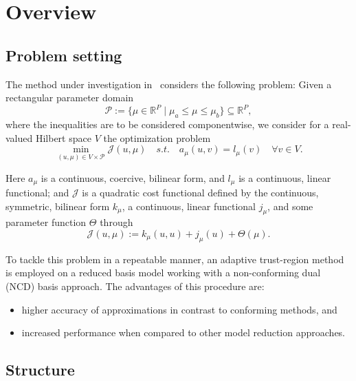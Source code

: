 \section{Overview}

\subsection{Problem setting}

The method under investigation in~\cite{Keil2021} considers the following problem: Given a rectangular parameter domain
\begin{equation*}\label{ParRect}
    \mathcal{P} := \{ \mu \in \mathbb{R}^P \; | \; \mu_a \leq \mu \leq \mu_b \} \subseteq \mathbb{R}^P,
\end{equation*}
where the inequalities are to be considered componentwise, we consider for a real-valued Hilbert space $V$ the optimization problem
\begin{equation}\label{SettingOpti}
    \min\limits_{(u, \mu) \in V \times \mathcal{P}} \mathcal{J}(u, \mu) \quad s.t. \quad a_\mu(u, v) = l_\mu(v) \quad \forall v \in V.
\end{equation}

Here $a_\mu$ is a continuous, coercive, bilinear form, and $l_\mu$ is a continuous, linear functional; and $\mathcal{J}$ is a quadratic cost functional defined by the continuous, symmetric, bilinear form $k_\mu$, a continuous, linear functional $j_\mu$, and some parameter function $\Theta$ through
\begin{equation*}
    \mathcal{J}(u, \mu) := k_\mu(u, u) + j_\mu(u) + \Theta(\mu).
\end{equation*}

To tackle this problem in a repeatable manner, an adaptive trust-region method is employed on a reduced basis model working with a non-conforming dual (NCD) basis approach.
The advantages of this procedure are:
\begin{itemize}
    \item higher accuracy of approximations in contrast to conforming methods, and
    \item increased performance when compared to other model reduction approaches.
\end{itemize}

\subsection{Structure}

